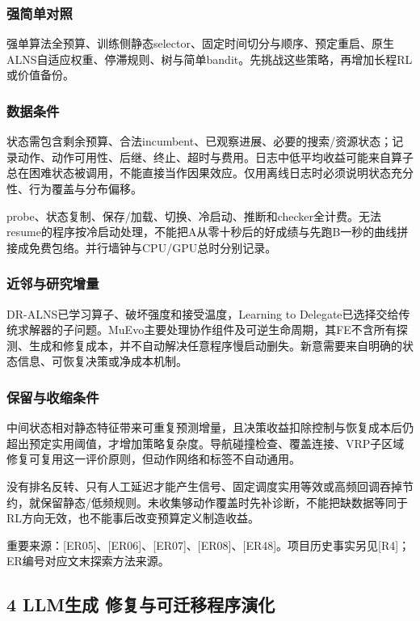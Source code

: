 \documentclass[11pt,a4paper]{article}
\newcommand{\bodytext}[1]{#1\par}
\newcommand{\sourcetext}[1]{{\fontsize{9.2}{14}\selectfont\color{Muted}#1\par}}
\begin{document}
\subsubsection{强简单对照}
\bodytext{强单算法全预算、训练侧静态selector、固定时间切分与顺序、预定重启、原生ALNS自适应权重、停滞规则、树与简单bandit。先挑战这些策略，再增加长程RL或价值备份。}
\subsubsection{数据条件}
\bodytext{状态需包含剩余预算、合法incumbent、已观察进展、必要的搜索/\allowbreak{}资源状态；记录动作、动作可用性、后继、终止、超时与费用。日志中低平均收益可能来自算子总在困难状态被调用，不能直接当作因果效应。仅用离线日志时必须说明状态充分性、行为覆盖与分布偏移。}
\bodytext{probe、状态复制、保存/\allowbreak{}加载、切换、冷启动、推断和checker全计费。无法resume的程序按冷启动处理，不能把A从零十秒后的好成绩与先跑B一秒的曲线拼接成免费包络。并行墙钟与CPU/\allowbreak{}GPU总时分别记录。}
\subsubsection{近邻与研究增量}
\bodytext{DR-ALNS已学习算子、破坏强度和接受温度，Learning to Delegate已选择交给传统求解器的子问题。MuEvo主要处理协作组件及可逆生命周期，其FE不含所有探测、生成和修复成本，并不自动解决任意程序慢启动删失。新意需要来自明确的状态信息、可恢复决策或净成本机制。}
\subsubsection{保留与收缩条件}
\bodytext{中间状态相对静态特征带来可重复预测增量，且决策收益扣除控制与恢复成本后仍超出预定实用阈值，才增加策略复杂度。导航碰撞检查、覆盖连接、VRP子区域修复可复用这一评价原则，但动作网络和标签不自动通用。}
\bodytext{没有排名反转、只有人工延迟才能产生信号、固定调度实用等效或高频回调吞掉节约，就保留静态/\allowbreak{}低频规则。未收集够动作覆盖时先补诊断，不能把缺数据等同于RL方向无效，也不能事后改变预算定义制造收益。}
\sourcetext{重要来源：[ER05]、[ER06]、[ER07]、[ER08]、[ER48]。项目历史事实另见[R4]；ER编号对应文末探索方法来源。}
\subsection{4  LLM生成 修复与可迁移程序演化}
\end{document}
